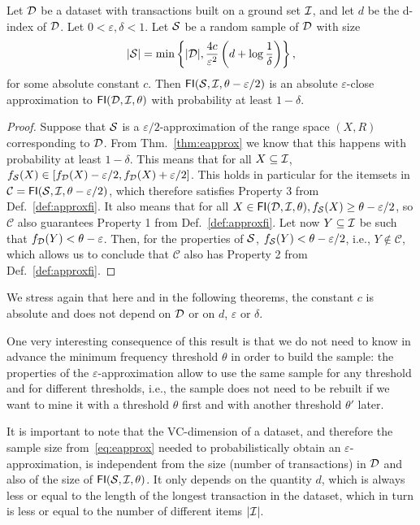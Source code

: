 \begin{lemma}\label{lem:absapproxfi}
  Let ${\cal D}$ be a dataset with transactions built on a ground set ${\cal I}$, and let
  $d$ be the d-index of ${\cal D}$. Let
  $0<\varepsilon,\delta<1$. Let ${\cal S}$ be a random sample of ${\cal D}$ with size 
  \[
  |{\cal S}|=\min\left\{|{\cal D}|,\frac{4c}{\varepsilon^2}\left(d+\log\frac{1}{\delta}\right)\right\},\]
  for some absolute constant $c$. Then $\mathsf{FI}({\cal S},{\cal I},\theta-\varepsilon/2)$ is an absolute
  $\varepsilon$-close approximation to $\mathsf{FI}({\cal D},{\cal I},\theta)$ with probability
  at least $1-\delta$.
\end{lemma}

\begin{proof}
  Suppose that ${\cal S}$ is a $\varepsilon/2$-approximation of the range space $(X,R)$ corresponding
  to ${\cal D}$. From Thm.~\ref{thm:eapprox} we know that this happens with probability at least $1-\delta$.  
  This means that for all $X\subseteq{\cal I}$,
  $f_{\cal S}(X)\in[f_{\cal D}(X)-\varepsilon/2,f_{\cal D}(X)+\varepsilon/2]$.
  This holds in particular for the itemsets in
  $\mathcal{C}=\mathsf{FI}({\cal S},{\cal I},\theta-\varepsilon/2)$, which therefore satisfies
  Property 3 from Def.~\ref{def:approxfi}. It also means that for all $X\in\mathsf{FI}({\cal D},{\cal I},\theta),
  f_{\cal S}(X)\ge \theta-\varepsilon/2$, so $\mathcal{C}$ also guarantees Property
  1 from Def.~\ref{def:approxfi}. Let now $Y\subseteq{\cal I}$ be such that
  $f_{\cal D}(Y)< \theta-\varepsilon$. Then, for the properties of ${\cal S}$,
  $f_{\cal S}(Y)<\theta-\varepsilon/2$, i.e., $Y\notin \mathcal{C}$, which allows us
  to conclude that $\mathcal{C}$ also has Property 2 from Def.~\ref{def:approxfi}.
\end{proof}

We stress again that here and in the following theorems, the constant $c$ is
absolute and does not depend on ${\cal D}$ or on $d$, $\varepsilon$ or $\delta$.

One very interesting consequence of this result is that we do not need to know in advance
the minimum frequency threshold $\theta$ in order to build the sample: the
properties of the $\varepsilon$-approximation allow to use the same sample
for any threshold and for different thresholds, i.e., the sample does not need
to be rebuilt if we want to mine it with a threshold $\theta$ first and with
another threshold $\theta'$ later.

It is important to note that the VC-dimension of a dataset, and therefore the
sample size from~\eqref{eq:eapprox} needed to probabilistically obtain an
$\varepsilon$-approximation, is independent from the size (number of
transactions) in ${\cal D}$ and also of the size of $\mathsf{FI}({\cal S},{\cal I},\theta)$. It
only depends on the quantity $d$, which is always less or equal to the length
of the longest transaction in the dataset, which in turn is less or equal to the
number of different items $|{\cal I}|$.

